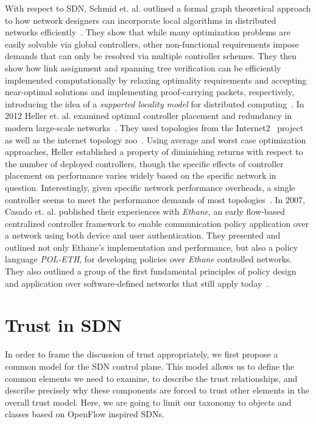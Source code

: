 \documentclass[10pt,conference]{IEEEtran}
\begin{document}
With respect to SDN, Schmid et. al. outlined a formal graph theoretical approach to how network designers can incorporate local algorithms in distributed networks efficiently~\cite{ScSu:13}.  They show that while many optimization problems are easily solvable via global controllers, other non-functional requirements impose demands that can only be resolved via multiple controller schemes. They then show how link assignment and spanning tree verification can be efficiently implemented computationally by relaxing optimality requirements and accepting near-optimal solutions and implementing proof-carrying packets, respectively, introducing the idea of a {\sl supported locality model} for distributed computing~\cite{ScSu:13}.  In 2012 Heller et. al. examined optimal controller placement and redundancy in modern large-scale networks~\cite{HeShMc:12}. They used topologies from the Internet2~\cite{internet2} project as well as the internet topology zoo~\cite{internet-topo-zoo}. Using average and worst case optimization approaches, Heller established a property of diminishing returns with respect to the number of deployed controllers, though the specific effects of controller placement on performance varies widely based on the specific network in question.  Interestingly, given specific network performance overheads, a single controller seems to meet the performance demands of most topologies~\cite{HeShMc:12}.  In 2007, Casado et. al. published their experiences with {\sl Ethane}, an early flow-based centralized controller framework to enable communication policy application over a network using both device and user authentication.  They presented and outlined not only Ethane's implementation and performance, but also a policy language {\sl POL-ETH}, for developing policies over {\sl Ethane} controlled networks.  They also outlined a group of the first fundamental principles of policy design and application over software-defined networks that still apply today~\cite{CaFrPeLu:07}.

\section{Trust in SDN}
In order to frame the discussion of trust appropriately, we first propose a common model for the SDN control plane.  This model allows us to define the common elements we need to examine, to describe the trust relationships, and describe precisely why these components are forced to trust other elements in the overall trust model.  Here, we are going to limit our taxonomy to objects and classes based on OpenFlow inspired SDNs.
\end{document}
